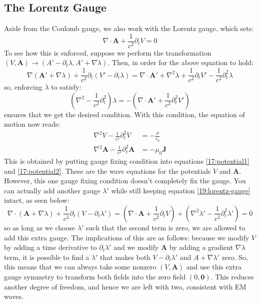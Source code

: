 \subsection{The Lorentz Gauge}
Aside from the Coulomb gauge, we also work with the Lorentz gauge, which sets:
\begin{equation}
	\label{19:lorentz-gauge}
	\nabla \cdot \mathbf{A} + \frac{1}{c^2}\partial_t V = 0
\end{equation}
To see how this is enforced, suppose we perform the transformation \( (V, \mathbf{A}) \to (A' - \partial_t
\lambda, A' + \nabla \lambda) \). Then, in order for the above equation to hold:
\[
	\nabla(\mathbf{A}' + \nabla \lambda) + \frac{1}{c^2}\partial_t (V' - \partial_t \lambda) = \nabla \cdot
	\mathbf{A}' + \nabla^2 \lambda + \frac{1}{c^2}\partial_t V' - \frac{1}{c^2}\partial_t^2 \lambda
\]
so, enforcing \( \lambda \) to satisfy:
\[
	\left( \nabla^2 - \frac{1}{c^2}\partial_t^2 \right)\lambda = -\left( \nabla \cdot \mathbf{A}' +
	\frac{1}{c^2}\partial_t^2 V' \right)
\]
ensures that we get the desired condition. With this condition, the equation of motion now reads:
\begin{align}
	\nabla^2 V - \frac{1}{c^2}\partial_t^2 V &= -\frac{\rho}{\epsilon_0} \\ 
	\nabla^2 \mathbf{A} - \frac{1}{c^2}\partial_t^2 \mathbf{A} &= -\mu_0 \mathbf{J}
\end{align}
This is obtained by putting gauge fixing condition into equations \ref{17:potential1} and
\ref{17:potential2}. These are the wave equations for the potentials \( V \) and \( \mathbf{A} \). However,
this one gauge fixing condition doesn't completely fix the gauge. You can actually add another gauge \(
\lambda' \) while still keeping equation \ref{19:lorentz-gauge} intact, as seen below:
\[
	\nabla \cdot(\mathbf{A} + \nabla \lambda) + \frac{1}{c^2}\partial_t(V - \partial_t \lambda') = \left(
	\nabla \cdot \mathbf{A} + \frac{1}{c^2}\partial_t V\right) + \left( \nabla^2 \lambda' -
\frac{1}{c^2}\partial_t^2 \lambda'\right) = 0 
\]
so as long as we choose \( \lambda' \) such that the second term is zero, we are allowed to add this extra
gauge. The implications of this are as follows: because we modify \( V \) by adding a time derivative to \(
\partial_t \lambda' \) and we modify \( \mathbf{A} \) by adding a gradient \( \nabla \lambda \) term, it is
possible to find a \( \lambda' \) that makes both \( V - \partial_t \lambda' \) and \( A + \nabla \lambda' \)
zero. So, this means that we can always take some nonzero \( (V, \mathbf{A}) \) and use this
extra gauge symmetry to transform both fields into the zero field \( (0, \mathbf{0}) \). This reduces another
degree of freedom, and hence we are left with two, consistent with EM waves.    

